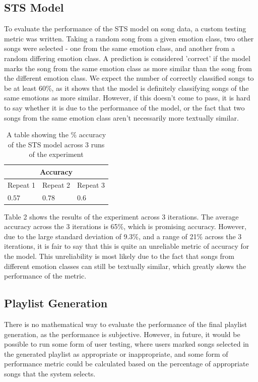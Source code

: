 \documentclass[11pt]{article}
\begin{document}
\subsection{STS Model}


To evaluate the performance of the STS model on song data, a custom testing metric was written. Taking a random song from a given emotion class, two other songs were selected - one from the same emotion class, and another from a random differing emotion class. A prediction is considered 'correct' if the model marks the song from the same emotion class as more similar than the song from the different emotion class.
We expect the number of correctly classified songs to be at least 60\%, as it shows that the model is definitely classifying songs of the same emotions as more similar. However, if this doesn't come to pass, it is hard to say whether it is due to the performance of the model, or the fact that two songs from the same emotion class aren't necessarily more textually similar.

\begin{table}[H]
    \centering
    \caption{A table showing the \% accuracy of the STS model across 3 runs of the experiment}
    \begin{tabularx}{0.48\textwidth}{|X X X|} 
      \hline
      \multicolumn{3}{|c|}{Accuracy} \\ \hline 
      Repeat 1 & Repeat 2 & Repeat 3 \\ \hline
      $0.57$&$0.78$ &$0.6$ \\ \hline
    \end{tabularx}
\end{table}

Table 2 shows the results of the experiment across 3 iterations. The average accuracy across the 3 iterations is 65\%, which is promising accuracy. However, due to the large standard deviation of 9.3\%, and a range of 21\% across the 3 iterations, it is fair to say that this is quite an unreliable metric of accuracy for the model. This unreliability is most likely due to the fact that songs from different emotion classes can still be textually similar, which greatly skews the performance of the metric.

\subsection{Playlist Generation}

There is no mathematical way to evaluate the performance of the final playlist generation, as the performance is subjective. However, in future, it would be possible to run some form of user testing, where users marked songs selected in the generated playlist as appropriate or inappropriate, and some form of performance metric could be calculated based on the percentage of appropriate songs that the system selects.
\end{document}
